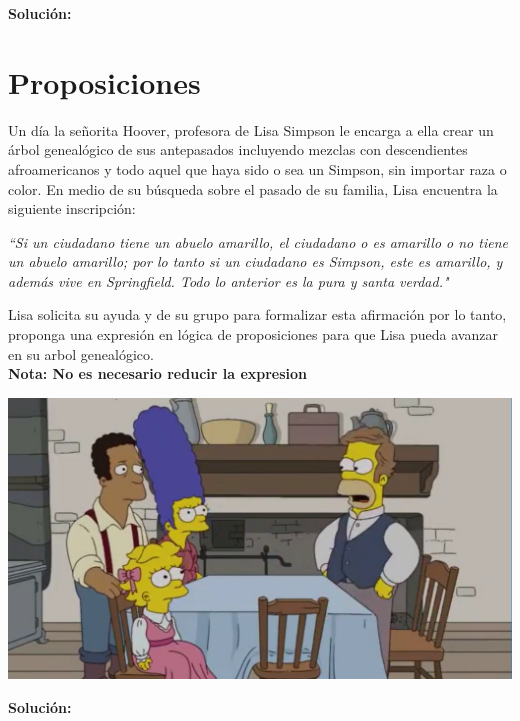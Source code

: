 \documentclass[letterpaper,10pt]{article}
\begin{document}
\textbf{Solución:}
\newpage
\section{Proposiciones}

Un día la señorita Hoover, profesora de Lisa Simpson le encarga a ella crear un árbol genealógico de sus antepasados incluyendo mezclas con descendientes afroamericanos y todo aquel que haya sido o sea un Simpson, sin importar raza o color. En medio de su búsqueda sobre el pasado de su familia, Lisa encuentra la siguiente inscripción:

\begin{center}
    \textit{``Si un ciudadano tiene un abuelo amarillo, el ciudadano o es amarillo o no tiene un abuelo amarillo; por lo tanto si un ciudadano es Simpson, este es amarillo, y además vive en Springfield. Todo lo anterior es la pura y santa verdad." }
   
\end{center}

Lisa solicita su ayuda y de su grupo para formalizar esta afirmación por lo tanto, proponga una expresión en lógica de proposiciones para que Lisa pueda avanzar en su arbol genealógico.\\
\textbf{Nota: No es necesario reducir la expresion}


\begin{center}
    \includegraphics[scale=0.3]{yellow3.PNG}
\end{center}

\textbf{Solución:}
\end{document}
